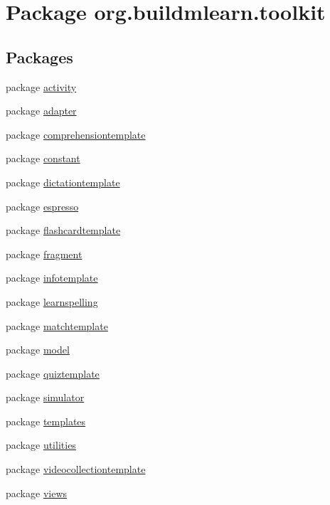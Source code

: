 \hypertarget{namespaceorg_1_1buildmlearn_1_1toolkit}{}\section{Package org.\+buildmlearn.\+toolkit}
\label{namespaceorg_1_1buildmlearn_1_1toolkit}
\subsection*{Packages}
\begin{DoxyCompactItemize}
\item 
package \hyperlink{namespaceorg_1_1buildmlearn_1_1toolkit_1_1activity}{activity}
\item 
package \hyperlink{namespaceorg_1_1buildmlearn_1_1toolkit_1_1adapter}{adapter}
\item 
package \hyperlink{namespaceorg_1_1buildmlearn_1_1toolkit_1_1comprehensiontemplate}{comprehensiontemplate}
\item 
package \hyperlink{namespaceorg_1_1buildmlearn_1_1toolkit_1_1constant}{constant}
\item 
package \hyperlink{namespaceorg_1_1buildmlearn_1_1toolkit_1_1dictationtemplate}{dictationtemplate}
\item 
package \hyperlink{namespaceorg_1_1buildmlearn_1_1toolkit_1_1espresso}{espresso}
\item 
package \hyperlink{namespaceorg_1_1buildmlearn_1_1toolkit_1_1flashcardtemplate}{flashcardtemplate}
\item 
package \hyperlink{namespaceorg_1_1buildmlearn_1_1toolkit_1_1fragment}{fragment}
\item 
package \hyperlink{namespaceorg_1_1buildmlearn_1_1toolkit_1_1infotemplate}{infotemplate}
\item 
package \hyperlink{namespaceorg_1_1buildmlearn_1_1toolkit_1_1learnspelling}{learnspelling}
\item 
package \hyperlink{namespaceorg_1_1buildmlearn_1_1toolkit_1_1matchtemplate}{matchtemplate}
\item 
package \hyperlink{namespaceorg_1_1buildmlearn_1_1toolkit_1_1model}{model}
\item 
package \hyperlink{namespaceorg_1_1buildmlearn_1_1toolkit_1_1quiztemplate}{quiztemplate}
\item 
package \hyperlink{namespaceorg_1_1buildmlearn_1_1toolkit_1_1simulator}{simulator}
\item 
package \hyperlink{namespaceorg_1_1buildmlearn_1_1toolkit_1_1templates}{templates}
\item 
package \hyperlink{namespaceorg_1_1buildmlearn_1_1toolkit_1_1utilities}{utilities}
\item 
package \hyperlink{namespaceorg_1_1buildmlearn_1_1toolkit_1_1videocollectiontemplate}{videocollectiontemplate}
\item 
package \hyperlink{namespaceorg_1_1buildmlearn_1_1toolkit_1_1views}{views}
\end{DoxyCompactItemize}
